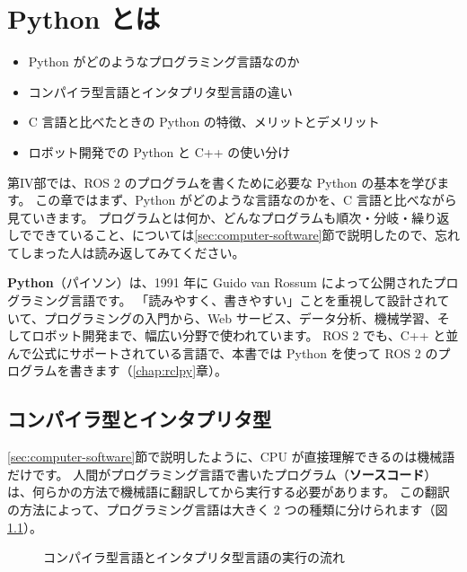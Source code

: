 \chapter{Python とは}
\label{chap:what_is_python}

\begin{goalbox}
  \begin{itemize}
    \item Python がどのようなプログラミング言語なのか
    \item コンパイラ型言語とインタプリタ型言語の違い
    \item C 言語と比べたときの Python の特徴、メリットとデメリット
    \item ロボット開発での Python と C++ の使い分け
  \end{itemize}
\end{goalbox}

第IV部では、ROS 2 のプログラムを書くために必要な Python の基本を学びます。
この章ではまず、Python がどのような言語なのかを、C 言語と比べながら見ていきます。
プログラムとは何か、どんなプログラムも順次・分岐・繰り返しでできていること、については\ref{sec:computer-software}節で説明したので、忘れてしまった人は読み返してみてください。

\textbf{Python}（パイソン）は、1991 年に Guido van Rossum によって公開されたプログラミング言語です。
「読みやすく、書きやすい」ことを重視して設計されていて、プログラミングの入門から、Web サービス、データ分析、機械学習、そしてロボット開発まで、幅広い分野で使われています。
ROS 2 でも、C++ と並んで公式にサポートされている言語で、本書では Python を使って ROS 2 のプログラムを書きます（\ref{chap:rclpy}章）。

\section{コンパイラ型とインタプリタ型}
\label{sec:python-compile-interpret}

\ref{sec:computer-software}節で説明したように、CPU が直接理解できるのは機械語だけです。
人間がプログラミング言語で書いたプログラム（\textbf{ソースコード}）は、何らかの方法で機械語に翻訳してから実行する必要があります。
この翻訳の方法によって、プログラミング言語は大きく 2 つの種類に分けられます（図\ref{fig:python-compile-interpret}）。

\begin{figure}[tb]
  \centering
  
  \caption{コンパイラ型言語とインタプリタ型言語の実行の流れ}
  \label{fig:python-compile-interpret}
\end{figure}

